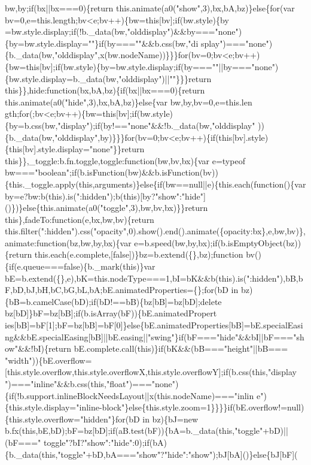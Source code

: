 \begin{DoxyCode}
{       bw,by;if(bx||bx===0)\{return this.animate(a0("show",3),bx,bA,bz)\}else\{for(var
       bv=0,e=this.length;bv<e;bv++)\{bw=this[bv];if(bw.style)\{by
      =bw.style.display;if(!b.\_data(bw,"olddisplay")&&by==="none")\{by=bw.style.display=""\}if(by===""&&b.css(bw,"di
      splay")==="none")\{b.\_data(bw,"olddisplay",x(bw.nodeName))\}\}\}for(bv=0;bv<e;bv++)\{bw=this[bv];if(bw.style)\{by=bw.style.display;if(by===""||by==="none")\{bw.style.display=b.\_data(bw,"olddisplay")||""\}\}\}return
       this\}\},hide:function(bx,bA,bz)\{if(bx||bx===0)\{return this.animate(a0("hide",3),bx,bA,bz)\}else\{var
       bw,by,bv=0,e=this.len
      gth;for(;bv<e;bv++)\{bw=this[bv];if(bw.style)\{by=b.css(bw,"display");if(by!=="none"&&!b.\_data(bw,"olddisplay"
      ))\{b.\_data(bw,"olddisplay",by)\}\}\}for(bv=0;bv<e;bv++)\{if(this[bv].style)\{this[bv].style.display="none"\}\}return this\}\},\_toggle:b.fn.toggle,toggle:function(bw,bv,bx)\{var e=typeof
       bw==="boolean";if(b.isFunction(bw)&&b.isFunction(bv))\{this.\_toggle.apply(this,arguments)\}else\{if(bw==null||e)\{this.each(function()\{var
       by=e?bw:b(this).is(":hidden");b(this)[by?"show":"hide"]()\})\}else\{this.animate(a0("toggle",3),bw,bv,bx)\}\}return
       this\},fadeTo:function(e,bx,bw,bv)\{return
       this.filter(":hidden").css("opacity",0).show().end().animate(\{opacity:bx\},e,bw,bv)\},animate:function(bz,bw,by,bx)\{var e=b.speed(bw,by,bx);if(b.isEmptyObject(bz))\{return
       this.each(e.complete,[false])\}bz=b.extend(\{\},bz);function bv()\{if(e.queue===false)\{b.\_mark(this)\}var
       bE=b.extend(\{\},e),bK=this.nodeType===1,bI=bK&&b(this).is(":hidden"),bB,bF,bD,bJ,bH,bC,bG,bL,bA;bE.animatedProperties=\{\};for(bD in
       bz)\{bB=b.camelCase(bD);if(bD!==bB)\{bz[bB]=bz[bD];delete
       bz[bD]\}bF=bz[bB];if(b.isArray(bF))\{bE.animatedPropert
      ies[bB]=bF[1];bF=bz[bB]=bF[0]\}else\{bE.animatedProperties[bB]=bE.specialEasing&&bE.specialEasing[bB]||bE.easing||"swing"\}if(bF==="hide"&&bI||bF==="show"&&!bI)\{return
       bE.complete.call(this)\}if(bK&&(bB==="height"||bB===
      "width"))\{bE.overflow=[this.style.overflow,this.style.overflowX,this.style.overflowY];if(b.css(this,"display
      ")==="inline"&&b.css(this,"float")==="none")\{if(!b.support.inlineBlockNeedsLayout||x(this.nodeName)==="inlin
      e")\{this.style.display="inline-block"\}else\{this.style.zoom=1\}\}\}\}if(bE.overflow!=null)\{this.style.overflow="hidden"\}for(bD in bz)\{bJ=new
       b.fx(this,bE,bD);bF=bz[bD];if(aB.test(bF))\{bA=b.\_data(this,"toggle"+bD)||(bF==="
      toggle"?bI?"show":"hide":0);if(bA)\{b.\_data(this,"toggle"+bD,bA==="show"?"hide":"show");bJ[bA]()\}else\{bJ[bF](
}
\end{DoxyCode}
